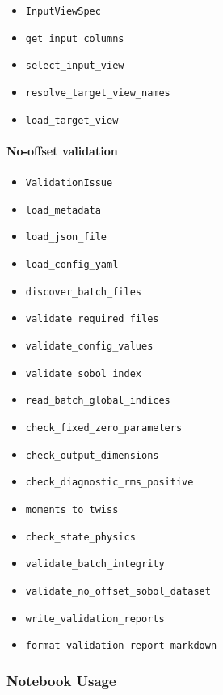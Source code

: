 \documentclass[
]{article}
\providecommand{\tightlist}{%
  \setlength{\itemsep}{0pt}\setlength{\parskip}{0pt}}
\begin{document}
\begin{itemize}
\tightlist
\item
  \texttt{InputViewSpec}
\item
  \texttt{get\_input\_columns}
\item
  \texttt{select\_input\_view}
\item
  \texttt{resolve\_target\_view\_names}
\item
  \texttt{load\_target\_view}
\end{itemize}

\hypertarget{no-offset-validation}{%
\paragraph{No-offset validation}\label{no-offset-validation}}

\begin{itemize}
\tightlist
\item
  \texttt{ValidationIssue}
\item
  \texttt{load\_metadata}
\item
  \texttt{load\_json\_file}
\item
  \texttt{load\_config\_yaml}
\item
  \texttt{discover\_batch\_files}
\item
  \texttt{validate\_required\_files}
\item
  \texttt{validate\_config\_values}
\item
  \texttt{validate\_sobol\_index}
\item
  \texttt{read\_batch\_global\_indices}
\item
  \texttt{check\_fixed\_zero\_parameters}
\item
  \texttt{check\_output\_dimensions}
\item
  \texttt{check\_diagnostic\_rms\_positive}
\item
  \texttt{moments\_to\_twiss}
\item
  \texttt{check\_state\_physics}
\item
  \texttt{validate\_batch\_integrity}
\item
  \texttt{validate\_no\_offset\_sobol\_dataset}
\item
  \texttt{write\_validation\_reports}
\item
  \texttt{format\_validation\_report\_markdown}
\end{itemize}

\hypertarget{notebook-usage}{%
\subsubsection{Notebook Usage}\label{notebook-usage}}
\end{document}
